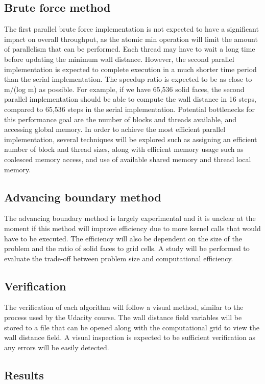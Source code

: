 \documentclass[]{aiaa-tc}%
\begin{document}
\subsection{Brute force method}
The first parallel brute force implementation is not expected to have a significant impact on overall throughput, as the atomic min operation will limit the amount of parallelism that can be performed.  Each thread may have to wait a long time before updating the minimum wall distance.  However, the second parallel implementation is expected to complete execution in a much shorter time period than the serial implementation.  The speedup ratio is expected to be as close to m/(log m) as possible.  For example, if we have 65,536 solid faces, the second parallel implementation should be able to compute the wall distance in 16 steps, compared to 65,536 steps in the serial implementation. Potential bottlenecks for this performance goal are the number of blocks and threads available, and accessing global memory. In order to achieve the most efficient parallel implementation, several techniques will be explored such as assigning an efficient number of block and thread sizes, along with efficient memory usage such as coalesced memory access, and use of available shared memory and thread local memory.

\subsection{Advancing boundary method}
The advancing boundary method is largely experimental and it is
unclear at the moment if this method will improve efficiency due to
more kernel calls that would have to be executed. The efficiency will
also be dependent on the size of the problem and the ratio of solid
faces to grid cells. A study will be performed to evaluate the
trade-off between problem size and computational efficiency.

\subsection{Verification}
The verification of each algorithm will follow a visual method,
similar to the process used by the Udacity course. The wall distance
field variables will be stored to a file that can be opened along with
the computational grid to view the wall distance field. A visual
inspection is expected to be sufficient verification as any errors will
be easily detected.


\subsection{Results}
\end{document}
